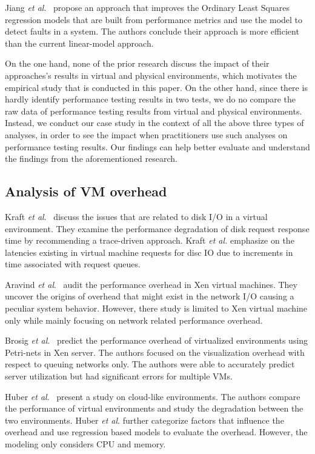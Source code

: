 \documentclass[smallextended]{svjour3}       %
\begin{document}
Jiang \emph{et al$.$}~\cite{Jiang:2009:SMM:1555228.1555233} propose an approach that improves the Ordinary Least Squares regression models that are built from performance metrics and use the model to detect faults in a system. The authors conclude their approach is more efficient than the current linear-model approach.

On the one hand, none of the prior research discuss the impact of their approaches's results in virtual and physical environments, which motivates the empirical study that is conducted in this paper. On the other hand, since there is hardly identify performance testing results in two tests, we do no compare the raw data of performance testing results from virtual and physical environments. Instead, we conduct our case study in the context of all the above three types of analyses, in order to see the impact when practitioners use such analyses on performance testing results. Our findings can help better evaluate and understand the findings from the aforementioned research. 



\subsection{Analysis of VM overhead}

Kraft \textit{et al$.$}~\cite{kraft2011io} discuss the issues that are related to disk I/O in a virtual environment. They examine the performance degradation of disk request response time by recommending a trace-driven approach. Kraft \textit{et al.} emphasize on the latencies existing in virtual machine requests for disc IO due to increments in time associated with request queues. 

Aravind \textit{et al$.$}~\cite{menon2005diagnosing} audit the performance overhead in Xen virtual machines. They uncover the origins of overhead that might exist in the network I/O causing a peculiar system behavior. However, there study is limited to Xen virtual machine only while mainly focusing on network related performance overhead.

Brosig \textit{et al$.$}~\cite{brosig2013evaluating} predict the performance overhead of virtualized environments using Petri-nets in Xen server. The authors focused on the visualization overhead with respect to queuing networks only. The authors were able to accurately predict server utilization but had significant errors for multiple VMs.


Huber \textit{et al$.$}~\cite{huber2011evaluating} present a study on cloud-like environments. The authors compare the performance of virtual environments and study the degradation between the two environments. Huber \textit{et al$.$} further categorize factors that influence the overhead and use regression based models to evaluate the overhead. However, the modeling only considers CPU and memory.
\end{document}

